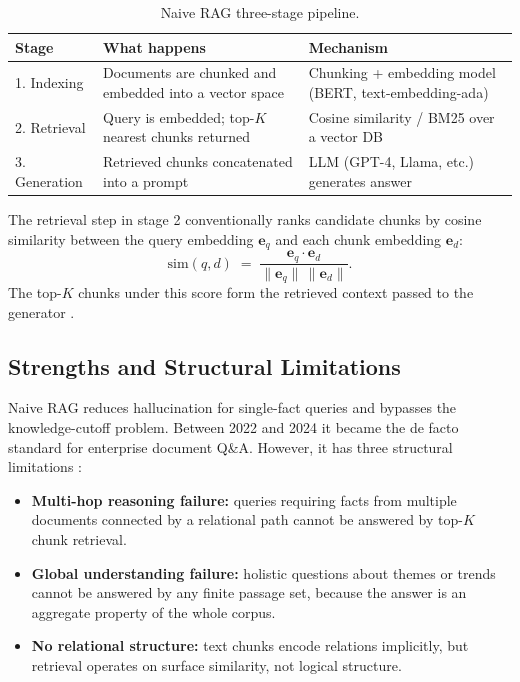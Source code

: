 \documentclass[12pt,a4paper,oneside]{report}
\begin{document}
\begin{table}[htbp]
\centering
\caption{Naive RAG three-stage pipeline.}
\label{tab:naive_rag}
\small
\begin{tabularx}{\textwidth}{@{}lXX@{}}
\toprule
\textbf{Stage} & \textbf{What happens} & \textbf{Mechanism} \\
\midrule
1. Indexing   & Documents are chunked and embedded into a vector space & Chunking + embedding model (BERT, text-embedding-ada) \\
2. Retrieval  & Query is embedded; top-$K$ nearest chunks returned     & Cosine similarity / BM25 over a vector DB \\
3. Generation & Retrieved chunks concatenated into a prompt            & LLM (GPT-4, Llama, etc.) generates answer \\
\bottomrule
\end{tabularx}
\end{table}

The retrieval step in stage 2 conventionally ranks candidate chunks by
cosine similarity between the query embedding $\mathbf{e}_q$ and each
chunk embedding $\mathbf{e}_d$:
\begin{equation}
    \mathrm{sim}(q, d) \;=\; \frac{\mathbf{e}_q \cdot \mathbf{e}_d}{\lVert \mathbf{e}_q \rVert \, \lVert \mathbf{e}_d \rVert}.
    \label{eq:cosine}
\end{equation}
The top-$K$ chunks under this score form the retrieved context passed
to the generator \citep{lewis2020}.

\subsection{Strengths and Structural Limitations}

Naive RAG reduces hallucination for single-fact queries and bypasses the
knowledge-cutoff problem. Between 2022 and 2024 it became the de facto
standard for enterprise document Q\&A. However, it has three structural
limitations \citep{han2025,msresearch2024}:
\begin{itemize}[leftmargin=2em,itemsep=2pt]
    \item \textbf{Multi-hop reasoning failure:} queries requiring facts from
          multiple documents connected by a relational path cannot be
          answered by top-$K$ chunk retrieval.
    \item \textbf{Global understanding failure:} holistic questions about
          themes or trends cannot be answered by any finite passage set,
          because the answer is an aggregate property of the whole corpus.
    \item \textbf{No relational structure:} text chunks encode relations
          implicitly, but retrieval operates on surface similarity, not
          logical structure.
\end{itemize}
\end{document}

